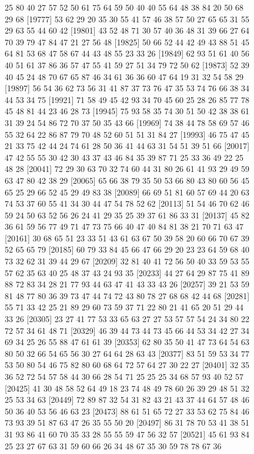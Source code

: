 \documentclass{article}
\begin{document}
\begin{figure}[H]
\begin{Schunk}
\begin{Soutput}
[19753] 25 80 40 27 57 52 50 61 75 64 59 50 40 40 55 64 48 38 84 20 50 68 29 68
[19777] 53 62 29 20 35 30 55 41 57 46 38 57 50 27 65 65 31 55 29 63 55 44 60 42
[19801] 43 52 48 71 30 57 40 36 48 31 39 66 27 64 70 39 79 47 84 47 21 27 56 48
[19825] 50 66 52 44 42 49 43 88 51 45 64 81 53 68 47 58 67 44 43 48 55 23 33 26
[19849] 62 93 51 61 40 56 40 51 61 37 86 36 57 47 55 41 59 27 51 34 79 72 50 62
[19873] 52 39 40 45 24 48 70 67 65 87 46 34 61 36 36 60 47 64 19 31 32 54 58 29
[19897] 56 54 36 62 73 56 31 41 87 37 73 76 47 35 53 74 76 66 38 34 44 53 34 75
[19921] 71 58 49 45 42 93 34 70 45 60 25 28 26 85 77 78 45 48 81 44 23 46 28 73
[19945] 75 93 58 35 74 30 51 50 42 38 38 61 31 39 24 54 86 72 70 37 50 35 43 66
[19969] 74 38 44 78 58 69 57 46 55 32 64 22 86 87 79 70 48 52 60 51 51 31 84 27
[19993] 46 75 47 45 21 33 75 42 44 24 74 61 28 50 36 41 44 63 31 54 51 39 51 66
[20017] 47 42 55 55 30 42 30 43 37 43 46 84 35 39 87 71 25 33 36 49 22 25 48 28
[20041] 72 29 30 63 70 32 74 60 44 31 80 26 61 41 93 29 49 59 63 47 80 42 38 29
[20065] 65 66 38 79 35 50 53 66 80 43 80 60 56 45 65 25 29 66 52 45 29 49 83 38
[20089] 66 69 51 81 60 57 69 44 20 63 74 53 37 60 55 41 34 30 44 47 54 78 52 62
[20113] 51 54 46 70 62 46 59 24 50 63 52 56 26 24 41 29 35 25 39 37 61 86 33 31
[20137] 45 82 36 61 59 56 77 49 71 47 73 75 66 40 47 40 84 81 38 21 70 71 63 47
[20161] 30 68 65 51 23 33 51 43 61 63 67 50 39 58 20 60 66 70 67 39 52 65 65 79
[20185] 60 79 33 84 45 66 47 66 29 20 23 23 64 59 68 40 73 32 62 31 39 44 29 67
[20209] 32 81 40 41 72 56 50 40 33 59 53 55 57 62 35 63 40 25 48 37 43 24 93 35
[20233] 44 27 64 29 87 75 41 89 88 72 83 34 28 21 77 93 44 63 47 41 43 33 43 26
[20257] 39 21 53 59 81 48 77 80 36 39 73 47 44 74 72 43 80 78 27 68 68 42 44 68
[20281] 55 71 33 42 25 21 89 29 60 73 59 37 71 22 80 21 41 65 20 51 29 44 33 26
[20305] 23 27 41 77 53 33 65 63 27 27 53 57 57 54 24 34 80 22 72 57 34 61 48 71
[20329] 46 39 44 73 44 73 45 66 44 53 34 42 27 34 69 34 25 26 55 88 47 61 61 39
[20353] 62 80 35 50 41 47 73 64 54 63 80 50 32 66 54 65 56 30 27 64 64 28 63 43
[20377] 83 51 59 53 34 77 53 50 80 54 46 75 82 80 60 68 64 72 57 64 27 30 22 27
[20401] 32 35 36 52 72 54 57 58 44 30 66 28 54 71 25 25 25 34 68 57 93 40 52 57
[20425] 41 30 48 58 52 64 49 18 23 74 48 49 78 60 26 39 29 48 51 32 25 53 34 63
[20449] 72 89 87 32 54 31 82 43 21 43 37 44 64 57 48 46 50 36 40 53 56 46 63 23
[20473] 88 61 51 65 72 27 33 53 62 75 84 46 73 93 39 51 87 63 47 26 35 55 50 20
[20497] 86 31 78 70 53 41 38 51 31 93 86 41 60 70 35 33 28 55 55 59 47 56 32 57
[20521] 45 61 93 84 25 23 27 67 63 31 59 60 66 26 34 48 67 35 30 59 78 78 67 36

\end{Soutput}
\end{Schunk}
\end{figure}
\end{document}

